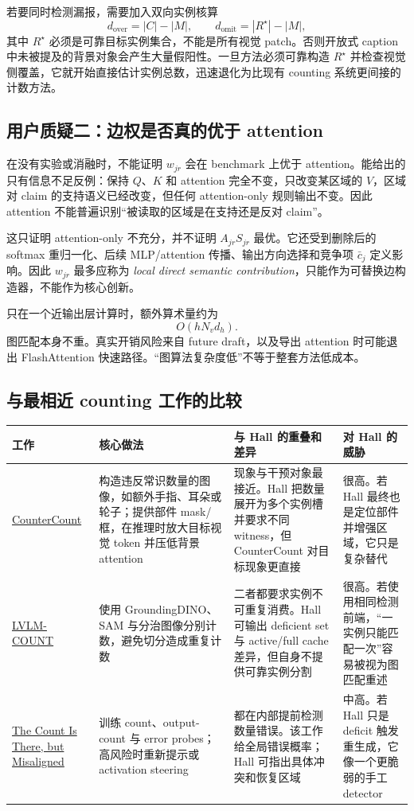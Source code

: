 \documentclass[UTF8,zihao=-4,a4paper]{ctexart}
\begin{document}
若要同时检测漏报，需要加入双向实例核算
\[
d_{\mathrm{over}}=|C|-|M|,
\qquad
d_{\mathrm{omit}}=|R^\star|-|M|,
\]
其中 $R^\star$ 必须是可靠目标实例集合，不能是所有视觉 patch。否则开放式 caption 中未被提及的背景对象会产生大量假阳性。一旦方法必须可靠构造 $R^\star$ 并检查视觉侧覆盖，它就开始直接估计实例总数，迅速退化为比现有 counting 系统更间接的计数方法。

\subsection{用户质疑二：边权是否真的优于 attention}

在没有实验或消融时，不能证明 $w_{jr}$ 会在 benchmark 上优于 attention。能给出的只有信息不足反例：保持 $Q$、$K$ 和 attention 完全不变，只改变某区域的 $V$，区域对 claim 的支持语义已经改变，但任何 attention-only 规则输出不变。因此 attention 不能普遍识别“被读取的区域是在支持还是反对 claim”。

这只证明 attention-only 不充分，并不证明 $A_{jr}S_{jr}$ 最优。它还受到删除后的 softmax 重归一化、后续 MLP/attention 传播、输出方向选择和竞争项 $\bar c_j$ 定义影响。因此 $w_{jr}$ 最多应称为 \emph{local direct semantic contribution}，只能作为可替换边构造器，不能作为核心创新。

只在一个近输出层计算时，额外算术量约为
\[
O(hN_vd_h).
\]
图匹配本身不重。真实开销风险来自 future draft，以及导出 attention 时可能退出 FlashAttention 快速路径。“图算法复杂度低”不等于整套方法低成本。

\subsection{与最相近 counting 工作的比较}

\begin{table}[htbp]
\centering
\footnotesize
\begin{tabularx}{\textwidth}{p{}X X p{}}
\toprule
工作 & 核心做法 & 与 Hall 的重叠和差异 & 对 Hall 的威胁 \\
\midrule
\href{https://arxiv.org/abs/2605.17826}{CounterCount}
& 构造违反常识数量的图像，如额外手指、耳朵或轮子；提供部件 mask/框，在推理时放大目标视觉 token 并压低背景 attention
& 现象与干预对象最接近。Hall 把数量展开为多个实例槽并要求不同 witness，但 CounterCount 对目标现象更直接
& 很高。若 Hall 最终也是定位部件并增强区域，它只是复杂替代 \\
\addlinespace
\href{https://arxiv.org/abs/2412.00686}{LVLM-COUNT}
& 使用 GroundingDINO、SAM 与分治图像分别计数，避免切分造成重复计数
& 二者都要求实例不可重复消费。Hall 可输出 deficient set 与 active/full cache 差异，但自身不提供可靠实例分割
& 很高。若使用相同检测前端，“一实例只能匹配一次”容易被视为图匹配重述 \\
\addlinespace
\href{https://arxiv.org/abs/2607.09544}{The Count Is There, but Misaligned}
& 训练 count、output-count 与 error probes；高风险时重新提示或 activation steering
& 都在内部提前检测数量错误。该工作给全局错误概率；Hall 可指出具体冲突和恢复区域
& 中高。若 Hall 只是 deficit 触发重生成，它像一个更脆弱的手工 detector \\
\bottomrule
\end{tabularx}
\end{table}
\end{document}
